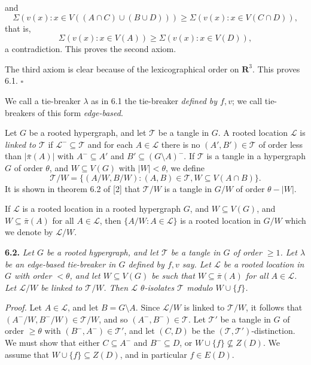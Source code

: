 \noindent and
\begin{equation*}
\Sigma(v(x) : x \in V((A \cap C) \cup (B \cup D))) \ge \Sigma(v(x) : x \in V(C \cap D)),
\end{equation*}
that is,
\begin{equation*}
\Sigma(v(x) : x \in V(A)) \ge \Sigma(v(x) : x \in V(D)),
\end{equation*}
a contradiction. This proves the second axiom.

The third axiom is clear because of the lexicographical order on $\mathbf{R}^3$. This proves 6.1. $\square$

We call a tie-breaker $\lambda$ as in 6.1 the tie-breaker \textit{defined by $f, v$}; we call tie-breakers of this form \textit{edge-based}.

Let $G$ be a rooted hypergraph, and let $\mathcal{T}$ be a tangle in $G$. A rooted location $\mathcal{L}$ is \textit{linked to $\mathcal{T}$} if $\mathcal{L}^- \subseteq \mathcal{T}$ and for each $A \in \mathcal{L}$ there is no $(A', B') \in \mathcal{T}$ of order less than $|\bar{\pi}(A)|$ with $A^- \subseteq A'$ and $B' \subseteq (G \setminus A)^-$. If $\mathcal{T}$ is a tangle in a hypergraph $G$ of order $\theta$, and $W \subseteq V(G)$ with $|W| < \theta$, we define
\begin{equation*}
\mathcal{T}/W = \{(A/W, B/W) : (A, B) \in \mathcal{T}, W \subseteq V(A \cap B)\}.
\end{equation*}
It is shown in theorem 6.2 of [2] that $\mathcal{T}/W$ is a tangle in $G/W$ of order $\theta - |W|$.

If $\mathcal{L}$ is a rooted location in a rooted hypergraph $G$, and $W \subseteq V(G)$, and $W \subseteq \bar{\pi}(A)$ for all $A \in \mathcal{L}$, then $\{A/W : A \in \mathcal{L}\}$ is a rooted location in $G/W$ which we denote by $\mathcal{L}/W$.

\textbf{6.2.} \textit{Let $G$ be a rooted hypergraph, and let $\mathcal{T}$ be a tangle in $G$ of order $\ge 1$. Let $\lambda$ be an edge-based tie-breaker in $G$ defined by $f, v$ say. Let $\mathcal{L}$ be a rooted location in $G$ with order $< \theta$, and let $W \subseteq V(G)$ be such that $W \subseteq \bar{\pi}(A)$ for all $A \in \mathcal{L}$. Let $\mathcal{L}/W$ be linked to $\mathcal{T}/W$. Then $\mathcal{L}$ $\theta$-isolates $\mathcal{T}$ modulo $W \cup \{f\}$.}

\textit{Proof.} Let $A \in \mathcal{L}$, and let $B = G \setminus A$. Since $\mathcal{L}/W$ is linked to $\mathcal{T}/W$, it follows that $(A^-/W, B^-/W) \in \mathcal{T}/W$, and so $(A^-, B^-) \in \mathcal{T}$. Let $\mathcal{T}'$ be a tangle in $G$ of order $\ge \theta$ with $(B^-, A^-) \in \mathcal{T}'$, and let $(C, D)$ be the $(\mathcal{T}, \mathcal{T}')$-distinction. We must show that either $C \subseteq A^-$ and $B^- \subseteq D$, or $W \cup \{f\} \not\subseteq Z(D)$. We assume that $W \cup \{f\} \subseteq Z(D)$, and in particular $f \in E(D)$.

